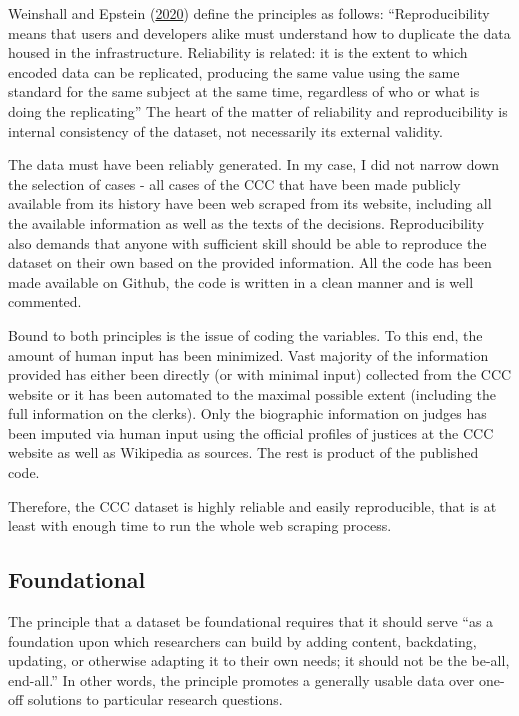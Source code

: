 \documentclass[
  11pt,
]{article}
\begin{document}
Weinshall and Epstein
(\protect\hyperlink{ref-weinshallDevelopingHighQualityData2020}{2020})
define the principles as follows: ``Reproducibility means that users and
developers alike must understand how to duplicate the data housed in the
infrastructure. Reliability is related: it is the extent to which
encoded data can be replicated, producing the same value using the same
standard for the same subject at the same time, regardless of who or
what is doing the replicating'' The heart of the matter of reliability
and reproducibility is internal consistency of the dataset, not
necessarily its external validity.

The data must have been reliably generated. In my case, I did not narrow
down the selection of cases - all cases of the CCC that have been made
publicly available from its history have been web scraped from its
website, including all the available information as well as the texts of
the decisions. Reproducibility also demands that anyone with sufficient
skill should be able to reproduce the dataset on their own based on the
provided information. All the code has been made available on Github,
the code is written in a clean manner and is well commented.

Bound to both principles is the issue of coding the variables. To this
end, the amount of human input has been minimized. Vast majority of the
information provided has either been directly (or with minimal input)
collected from the CCC website or it has been automated to the maximal
possible extent (including the full information on the clerks). Only the
biographic information on judges has been imputed via human input using
the official profiles of justices at the CCC website as well as
Wikipedia as sources. The rest is product of the published code.

Therefore, the CCC dataset is highly reliable and easily reproducible,
that is at least with enough time to run the whole web scraping process.

\hypertarget{foundational}{%
\subsection{Foundational}\label{foundational}}

The principle that a dataset be foundational requires that it should
serve ``as a foundation upon which researchers can build by adding
content, backdating, updating, or otherwise adapting it to their own
needs; it should not be the be-all, end-all.'' In other words, the
principle promotes a generally usable data over one-off solutions to
particular research questions.
\end{document}

